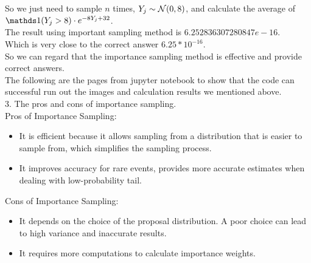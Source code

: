 \begin{homeworkProblem}
So we just need to sample $n$ times, $Y_j\sim \mathcal{N}(0,8)$, and calculate the average of $\I(Y_j>8)\cdot e^{-8Y_j+32}$.\\

The result using important sampling method is $6.252836307280847e-16$. \\
Which is very close to the correct answer $6.25*10^{-16}$. \\
So we can regard that the importance sampling method is effective and provide correct answers. \\

The following are the pages from jupyter notebook to show that the code can successful run out the images and calculation results we mentioned above. \\



3. The pros and cons of importance sampling. \\
Pros of Importance Sampling:
\begin{itemize}
    \item It is efficient because it allows sampling from a distribution that is easier to sample from, which simplifies the sampling process.
    \item It improves accuracy for rare events, provides more accurate estimates when dealing with low-probability tail.
\end{itemize}
Cons of Importance Sampling:
\begin{itemize}
    \item It depends on the choice of the proposal distribution. A poor choice can lead to high variance and inaccurate results.
    \item It requires more computations to calculate importance weights.
\end{itemize}

\end{homeworkProblem}

\newpage